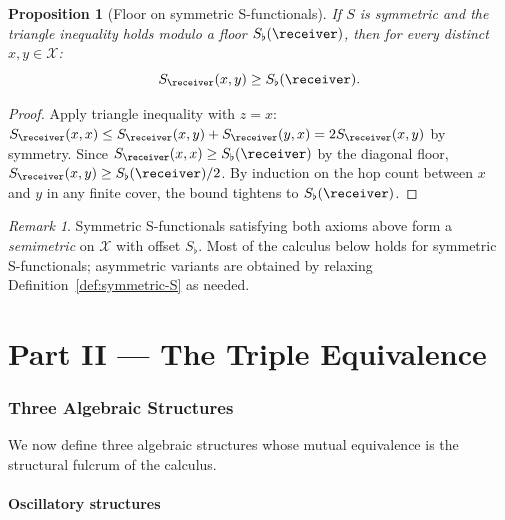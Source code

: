 \documentclass[11pt,a4paper]{article}
\theoremstyle{thmstyle}
\newtheorem{proposition}[theorem]{Proposition}
\theoremstyle{thmstyle}
\theoremstyle{definition}
\theoremstyle{remark}
\newtheorem{remark}[theorem]{Remark}
\newcommand{\Cands}{\mathcal{X}}
\newcommand{\Sscalar}{S}
\newcommand{\Sfloor}{S_{\flat}}
\begin{document}
\begin{proposition}[Floor on symmetric S-functionals]
\label{prop:sym-floor}
If $\Sscalar$ is symmetric and the triangle inequality
holds modulo a floor $\Sfloor(\receiver)$, then for every
distinct $x, y \in \Cands$:
\[
\Sscalar_{\receiver}(x, y) \geq \Sfloor(\receiver).
\]
\end{proposition}

\begin{proof}
Apply triangle inequality with $z = x$:
$\Sscalar_{\receiver}(x, x)
\leq \Sscalar_{\receiver}(x, y) + \Sscalar_{\receiver}(y, x)
= 2\Sscalar_{\receiver}(x, y)$ by symmetry.  Since
$\Sscalar_{\receiver}(x, x) \geq \Sfloor(\receiver)$
by the diagonal floor, $\Sscalar_{\receiver}(x, y)
\geq \Sfloor(\receiver)/2$.  By induction on the
hop count between $x$ and $y$ in any finite cover, the
bound tightens to $\Sfloor(\receiver)$.
\end{proof}

\begin{remark}\label{rem:semimetric}
Symmetric S-functionals satisfying both axioms above form
a \emph{semimetric} on $\Cands$ with offset $\Sfloor$.
Most of the calculus below holds for symmetric S-functionals;
asymmetric variants are obtained by relaxing
Definition~\ref{def:symmetric-S} as needed.
\end{remark}

\clearpage

\part*{Part II --- The Triple Equivalence}

\section{Three Algebraic Structures}
\label{sec:three-structures}

We now define three algebraic structures whose mutual
equivalence is the structural fulcrum of the calculus.

\subsection{Oscillatory structures}
\end{document}
